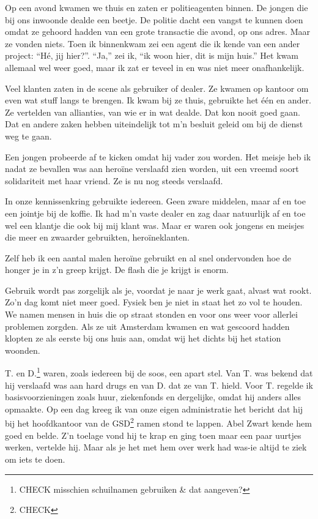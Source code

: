 \documentclass[10pt,twoside,openright]{memoir}
\begin{document}
Op een avond kwamen we thuis en zaten er politieagenten binnen. De jongen die bij ons inwoonde dealde een beetje. De politie dacht een vangst te kunnen doen omdat ze gehoord hadden van een grote transactie die avond, op ons adres. Maar ze vonden niets. Toen ik binnenkwam zei een agent die ik kende van een ander project: ``Hé, jij hier?''. ``Ja,'' zei ik, ``ik woon hier, dit is mijn huis.'' Het kwam allemaal wel weer goed, maar ik zat er teveel in en was niet meer onafhankelijk. 

Veel klanten zaten in de scene als gebruiker of dealer. Ze kwamen op kantoor om even wat stuff langs te brengen. Ik kwam bij ze thuis, gebruikte het één en ander. Ze vertelden van allianties, van wie er in wat dealde. Dat kon nooit goed gaan. Dat en andere zaken hebben uiteindelijk tot m’n besluit geleid om bij de dienst weg te gaan. 

Een jongen probeerde af te kicken omdat hij vader zou worden. Het meisje heb ik nadat ze bevallen was aan heroïne verslaafd zien worden, uit een vreemd soort solidariteit met haar vriend. Ze is nu nog steeds verslaafd. 

In onze kennissenkring gebruikte iedereen. Geen zware middelen, maar af en toe een jointje bij de koffie. Ik had m’n vaste dealer en zag daar natuurlijk af en toe wel een klantje die ook bij mij klant was. Maar er waren ook jongens en meisjes die meer en zwaarder gebruikten, heroïneklanten. 

Zelf heb ik een aantal malen heroïne gebruikt en al snel ondervonden hoe de honger je in z’n greep krijgt. De flash die je krijgt is enorm.

Gebruik wordt pas zorgelijk als je, voordat je naar je werk gaat, alvast wat rookt. Zo’n dag komt niet meer goed. Fysiek ben je niet in staat het zo vol te houden. We namen mensen in huis die op straat stonden en voor ons weer voor allerlei problemen zorgden. Als ze uit Amsterdam kwamen en wat gescoord hadden klopten ze als eerste bij ons huis aan, omdat wij het dichts bij het station woonden. 

T. en D.\footnote{CHECK misschien schuilnamen gebruiken \& dat aangeven?} waren, zoals iedereen bij de soos, een apart stel. Van T. was bekend dat hij verslaafd was aan hard drugs en van D. dat ze van T. hield. Voor T. regelde ik basisvoorzieningen zoals huur, ziekenfonds en dergelijke, omdat hij anders alles opmaakte. Op een dag kreeg ik van onze eigen administratie het bericht dat hij bij het hoofdkantoor van de GSD\footnote{CHECK} ramen stond te lappen. Abel Zwart kende hem goed en belde. Z’n toelage vond hij te krap en ging toen maar een paar uurtjes werken, vertelde hij. Maar als je het met hem over werk had was-ie altijd te ziek om iets te doen. 
\end{document}
